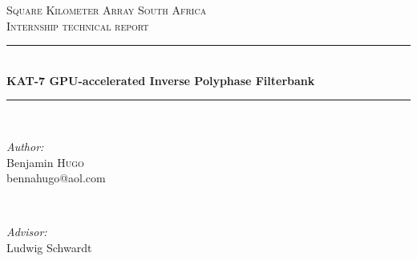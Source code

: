 \documentclass[a4paper,10pt]{article}
\begin{document}
\begin{titlepage}

\newcommand{\HRule}{\rule{\linewidth}{0.5mm}} %

\center %
 

\textsc{\LARGE Square Kilometer Array South Africa}\\[1.5cm]
\textsc{\Large Internship technical report}\\[0.5cm]


\HRule \\[0.4cm]
{ \huge \bfseries KAT-7 GPU-accelerated Inverse Polyphase Filterbank}\\[0.4cm]
\HRule \\[1.5cm]
 

\begin{minipage}{0.4\textwidth}
\begin{flushleft} \large
\emph{Author:}\\
Benjamin \textsc{Hugo}\\ %
\small{bennahugo@aol.com}
\end{flushleft}
\end{minipage}
~
\begin{minipage}{0.4\textwidth}
\begin{flushright} \large
\emph{Advisor:} \\
Ludwig Schwardt
\end{flushright}
\end{minipage}\\[4cm]



\end{titlepage}
\end{document}

